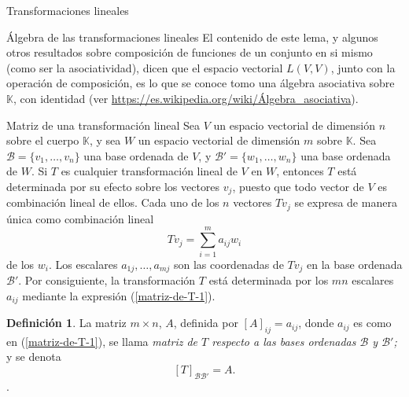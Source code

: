 \documentclass[a4paper,12pt,twoside,spanish,reqno]{amsbook}
\theoremstyle{definition}
\newtheorem{definicion}{Definici\'on}[section]
\theoremstyle{remark}
\newcommand{\K}{\mathbb K}
\begin{document}
\begin{chapter}{Transformaciones lineales}
\begin{section}{Álgebra de las transformaciones lineales}
    El contenido de este lema, y algunos otros resultados  sobre composición de funciones de un conjunto en si mismo (como ser la asociatividad), dicen que el espacio vectorial $L(V, V)$, junto con la operación de composición, es lo que se conoce tomo una  álgebra asociativa sobre $\K$,  con identidad (ver \href{https://es.wikipedia.org/wiki/Álgebra\_asociativa}{https://es.wikipedia.org/wiki/Álgebra\_asociativa}). 
    
    

        \end{section}
    
        \begin{section}{Matriz de una transformación lineal}
            Sea $V$ un espacio vectorial de dimensión $n$ sobre el cuerpo $\K$, y sea $W$ un espacio vectorial de dimensión $m$ sobre $\K$. Sea $\mathcal B = \{v_1,\ldots,v_n\}$ una base ordenada de $V$, y $\mathcal B' = \{w_1,\ldots,w_n\}$ una base ordenada de $W$. Si $T$ es cualquier 		transformación lineal de $V$ en $W$, entonces $T$ está determinada por su efecto sobre los vectores $v_j$, puesto que todo vector de $V$ es combinación lineal de ellos. Cada uno de los $n$ vectores $Tv_j$ se expresa de manera única 	como combinación lineal
            \begin{equation}\label{matriz-de-T-1}
                Tv_j = \sum_{i=1}^{m} a_{ij} w_i
            \end{equation}
            de los $w_i$. Los escalares $a_{1j},\ldots,a_{mj}$ son las coordenadas de $Tv_j$ en la base ordenada $\mathcal B'$. Por consiguiente, la transformación $T$ está determinada por los
            $mn$ escalares $a_{ij}$ mediante la expresión (\ref{matriz-de-T-1}). 
            
            \begin{definicion}
                La matriz $m \times n$, $A$, definida por $[A]_{ij} = a_{ij}$, donde $a_{ij}$  es como en  (\ref{matriz-de-T-1}), se llama \textit{matriz de $T$ respecto a las bases ordenadas $\mathcal B$ y $\mathcal B'$;} y se denota 
                $$
                [T]_{\mathcal B \mathcal B'} = A .
                $$.
            \end{definicion}
            

\end{section}
\end{chapter}
\end{document}
